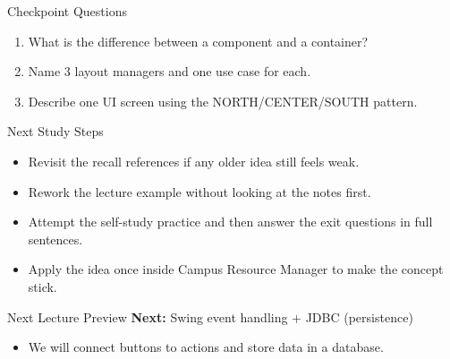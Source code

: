 \documentclass{beamer}
\begin{document}
\begin{frame}{Checkpoint Questions}
  \begin{enumerate}[<+->]
    \item What is the difference between a component and a container?
    \item Name 3 layout managers and one use case for each.
    \item Describe one UI screen using the NORTH/CENTER/SOUTH pattern.
  \end{enumerate}
  \slidesources{\OOPSUnitIVSources}
\end{frame}

\begin{frame}{Next Study Steps}
\begin{itemize}[<+->]
  \item Revisit the recall references if any older idea still feels weak.
  \item Rework the lecture example without looking at the notes first.
  \item Attempt the self-study practice and then answer the exit questions in full sentences.
  \item Apply the idea once inside Campus Resource Manager to make the concept stick.
\end{itemize}
  \slidesources{\OOPSUnitIVSources}
\end{frame}

\begin{frame}{Next Lecture Preview}
  \textbf{Next:} Swing event handling + JDBC (persistence)
  \vspace{0.6em}
  \begin{itemize}[<+->]
    \item We will connect buttons to actions and store data in a database.
  \end{itemize}
  \slidesources{\OOPSUnitIVSources}
\end{frame}
\end{document}
